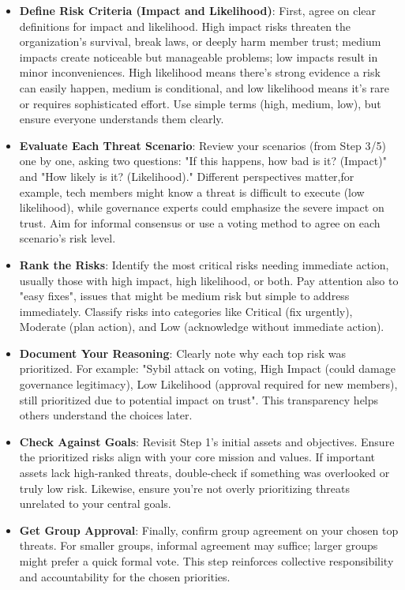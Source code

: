 \begin{itemize}

    \item \textbf{Define Risk Criteria (Impact and Likelihood)}: First, agree on clear
    definitions for impact and likelihood. High impact risks threaten the
    organization's survival, break laws, or deeply harm member trust; medium impacts
    create noticeable but manageable problems; low impacts result in minor
    inconveniences. High likelihood means there's strong evidence a risk can easily
    happen, medium is conditional, and low likelihood means it's rare or requires
    sophisticated effort. Use simple terms (high, medium, low), but ensure everyone
    understands them clearly.
    
    \item \textbf{Evaluate Each Threat Scenario}: Review your scenarios (from Step 3/5) one by one,
    asking two questions: "If this happens, how bad is it? (Impact)" and "How likely
    is it? (Likelihood)." Different perspectives matter,for example, tech members
    might know a threat is difficult to execute (low likelihood), while governance
    experts could emphasize the severe impact on trust. Aim for informal consensus
    or use a voting method to agree on each scenario's risk level.
    
    \item \textbf{Rank the Risks}: Identify the most critical risks needing immediate
    action, usually those with high impact, high likelihood, or both. Pay attention
    also to "easy fixes", issues that might be medium risk but simple to address
    immediately. Classify risks into categories like Critical (fix urgently),
    Moderate (plan action), and Low (acknowledge without immediate action).
    
    \item \textbf{Document Your Reasoning}: Clearly note why each top risk was
    prioritized. For example: "Sybil attack on voting, High Impact (could damage
    governance legitimacy), Low Likelihood (approval required for new members), still
    prioritized due to potential impact on trust". This transparency helps others
    understand the choices later.
    
    \item \textbf{Check Against Goals}: Revisit Step 1's initial assets and objectives.
    Ensure the prioritized risks align with your core mission and values. If
    important assets lack high-ranked threats, double-check if something was
    overlooked or truly low risk. Likewise, ensure you're not overly prioritizing
    threats unrelated to your central goals.
    
    \item \textbf{Get Group Approval}: Finally, confirm group agreement on your chosen
    top threats. For smaller groups, informal agreement may suffice; larger groups
    might prefer a quick formal vote. This step reinforces collective responsibility
    and accountability for the chosen priorities.

\end{itemize}
    
